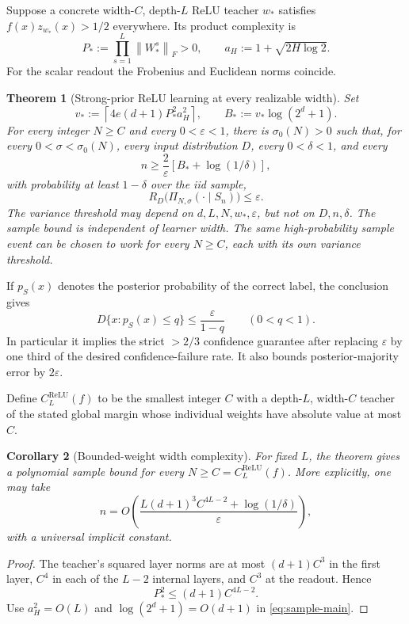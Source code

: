 \documentclass[11pt]{article}
\newtheorem{theorem}{Theorem}[section]
\newtheorem{corollary}[theorem]{Corollary}
\theoremstyle{remark}\newtheorem{remark}[theorem]{Remark}
\newcommand{\relu}{\operatorname{ReLU}}
\newcommand{\norm}[1]{\left\lVert#1\right\rVert}
\begin{document}
Suppose a concrete width-$C$, depth-$L$ ReLU teacher $w_*$ satisfies $f(x)z_{w_*}(x)>1/2$ everywhere. Its product complexity is
\[
 P_*:=\prod_{s=1}^L\norm{W_*^s}_F>0,
 \qquad a_H:=1+\sqrt{2H\log2}.
\]
For the scalar readout the Frobenius and Euclidean norms coincide.

\begin{theorem}[Strong-prior ReLU learning at every realizable width]
\label{thm:main}
Set
\[
 v_*:=\left\lceil4e(d+1)P_*^2 a_H^2\right\rceil,
 \qquad B_*:=v_*\log(2^d+1).
\]
For every integer $N\ge C$ and every $0<\varepsilon<1$, there is $\sigma_0(N)>0$ such that, for every $0<\sigma<\sigma_0(N)$, every input distribution $D$, every $0<\delta<1$, and every
\begin{equation}\label{eq:sample-main}
 n\ge\frac2\varepsilon\left[B_*+\log(1/\delta)\right],
\end{equation}
with probability at least $1-\delta$ over the iid sample,
\[
 R_D\bigl(\Pi_{N,\sigma}(\cdot\mid S_n)\bigr)\le\varepsilon.
\]
The variance threshold may depend on $d,L,N,w_*,\varepsilon$, but not on $D,n,\delta$. The sample bound is independent of learner width. The same high-probability sample event can be chosen to work for every $N\ge C$, each with its own variance threshold.
\end{theorem}

If $p_S(x)$ denotes the posterior probability of the correct label, the conclusion gives
\[
 D\{x:p_S(x)\le q\}\le\frac{\varepsilon}{1-q}\qquad(0<q<1).
\]
In particular it implies the strict $>2/3$ confidence guarantee after replacing $\varepsilon$ by one third of the desired confidence-failure rate. It also bounds posterior-majority error by $2\varepsilon$.

Define $C_L^{\relu}(f)$ to be the smallest integer $C$ with a depth-$L$, width-$C$ teacher of the stated global margin whose individual weights have absolute value at most $C$.
\begin{corollary}[Bounded-weight width complexity]
\label{cor:width}
For fixed $L$, the theorem gives a polynomial sample bound for every $N\ge C=C_L^{\relu}(f)$. More explicitly, one may take
\[
 n=O\!\left(\frac{L(d+1)^3 C^{4L-2}+\log(1/\delta)}{\varepsilon}\right),
\]
with a universal implicit constant.
\end{corollary}
\begin{proof}
The teacher's squared layer norms are at most $(d+1)C^3$ in the first layer, $C^4$ in each of the $L-2$ internal layers, and $C^3$ at the readout. Hence
\[
 P_*^2\le(d+1)C^{4L-2}.
\]
Use $a_H^2=O(L)$ and $\log(2^d+1)=O(d+1)$ in \eqref{eq:sample-main}.
\end{proof}
\end{document}
